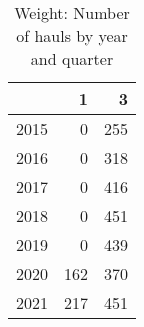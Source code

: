 \begin{table}[ht]
\centering
\begin{tabular}{rrr}
  \hline
 & 1 & 3 \\ 
  \hline
2015 & 0 & 255 \\ 
  2016 & 0 & 318 \\ 
  2017 & 0 & 416 \\ 
  2018 & 0 & 451 \\ 
  2019 & 0 & 439 \\ 
  2020 & 162 & 370 \\ 
  2021 & 217 & 451 \\ 
   \hline
\end{tabular}
\caption{Weight: Number of hauls by year and quarter} 
\end{table}
